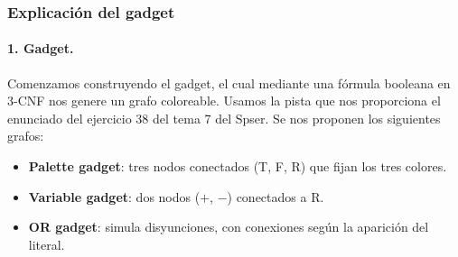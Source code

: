 \documentclass[a4paper,12pt]{article}
\begin{document}
\subsubsection*{ Explicación del gadget}

\paragraph{1. Gadget.} 
Comenzamos construyendo el gadget, el cual mediante una fórmula booleana en 3-CNF nos genere un grafo coloreable. Usamos la pista que nos proporciona el enunciado del ejercicio 38 del tema 7 del Spser. Se nos proponen los siguientes grafos:

\begin{itemize}
  \item \textbf{Palette gadget}: tres nodos conectados (T, F, R) que fijan los tres colores.
\begin{center}
\end{center}

  \item \textbf{Variable gadget}: dos nodos (\(+\), \(−\)) conectados a R.
\begin{center}
\end{center}

  \item \textbf{OR gadget}: simula disyunciones, con conexiones según la aparición del literal.
\begin{center}
\end{center}
\end{itemize}
\end{document}
